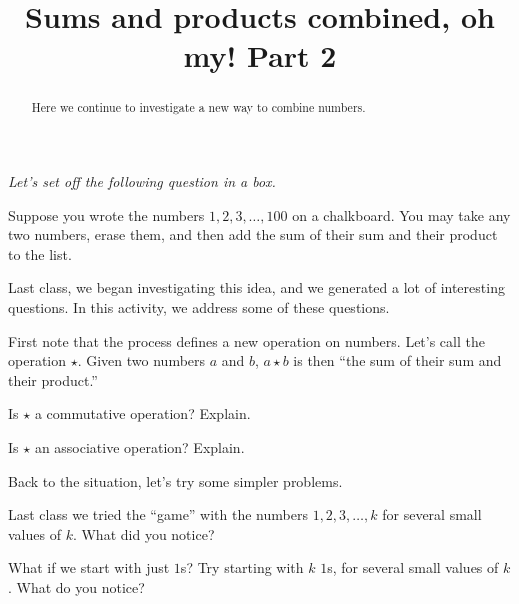 \documentclass[handout,space,nooutcomes]{ximera}
\title{Sums and products combined, oh my!  Part 2}
\begin{document}
\begin{abstract}
Here we continue to investigate a new way to combine numbers.
\end{abstract}
\maketitle

\emph{Let's set off the following question in a box.} 

Suppose you wrote the numbers $1,2,3,\dots,100$ on a chalkboard. You
may take any two numbers, erase them, and then add the sum of their
sum and their product to the list.

Last class, we began investigating this idea, and we generated a lot of interesting questions.  
In this activity, we address some of these questions.  

First note that the process defines a new operation on numbers.  Let's call the operation $\star$.  Given two numbers $a$ and $b$,  $a\star b$ is then ``the sum of their sum and their product.''    

\begin{problem}
Is $\star$ a commutative operation?  Explain.  
\begin{freeResponse}
\end{freeResponse}
\end{problem}

\begin{problem}
Is $\star$ an associative operation?  Explain.  
\begin{freeResponse}
\end{freeResponse}
\end{problem}

Back to the situation, let's try some simpler problems.  

\begin{problem}
Last class we tried the ``game'' with the numbers $1,2,3,\dots, k$ for
several small values of $k$.  What did you notice?
\begin{freeResponse}
\end{freeResponse}
\end{problem}

\begin{problem}
What if we start with just $1$s?  Try starting with $k$ $1$s, for
several small values of $k$.  What do you notice?
\begin{freeResponse}
\end{freeResponse}
\end{problem}
\end{document}
